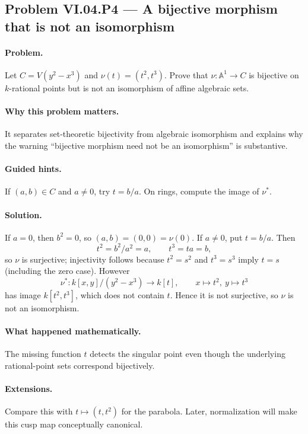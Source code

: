 \subsection*{Problem VI.04.P4 --- A bijective morphism that is not an isomorphism}
\label{prob:vi04-p4}
\paragraph{Problem.}
Let \(C=V(y^2-x^3)\) and \(\nu(t)=(t^2,t^3)\).  Prove that \(\nu:\mathbb A^1\to C\) is
bijective on \(k\)-rational points but is not an isomorphism of affine algebraic sets.
\ifdefined\FullProblemDossiers
\paragraph{Why this problem matters.}  It separates set-theoretic bijectivity from
algebraic isomorphism and explains why the warning ``bijective morphism need not be an
isomorphism'' is substantive.
\paragraph{Guided hints.}  If \((a,b)\in C\) and \(a\neq0\), try \(t=b/a\).  On rings,
compute the image of \(\nu^*\).
\paragraph{Solution.}
If \(a=0\), then \(b^2=0\), so \((a,b)=(0,0)=\nu(0)\).  If \(a\neq0\), put \(t=b/a\).
Then
\[
t^2=b^2/a^2=a,
\qquad
t^3=ta=b,
\]
so \(\nu\) is surjective; injectivity follows because \(t^2=s^2\) and \(t^3=s^3\) imply
\(t=s\) (including the zero case).  However
\[
\nu^*:k[x,y]/(y^2-x^3)\to k[t],\qquad x\mapsto t^2,\ y\mapsto t^3
\]
has image \(k[t^2,t^3]\), which does not contain \(t\).  Hence it is not surjective, so
\(\nu\) is not an isomorphism.
\paragraph{What happened mathematically.}  The missing function \(t\) detects the singular
point even though the underlying rational-point sets correspond bijectively.
\paragraph{Extensions.}  Compare this with \(t\mapsto(t,t^2)\) for the parabola.  Later,
normalization will make this cusp map conceptually canonical.
\fi
